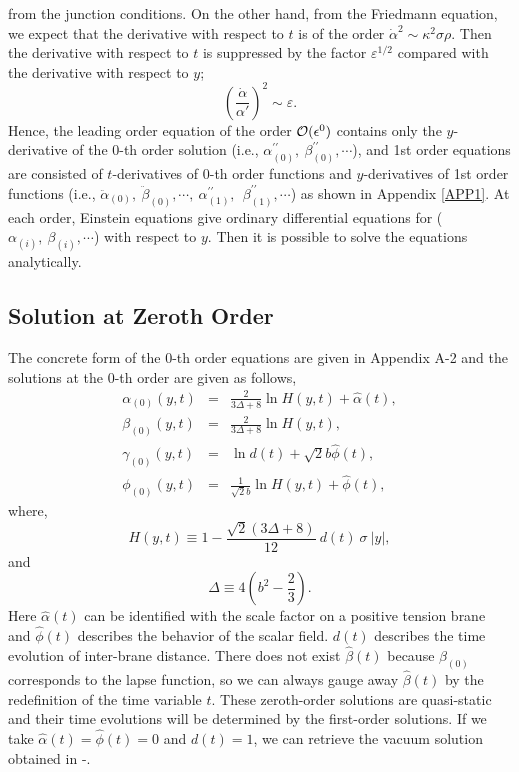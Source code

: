 \documentclass[a4paper,11pt]{article}
\begin{document}
from the junction conditions.
On the other hand, from the Friedmann equation, we expect 
that the derivative with respect to $t$ is of the order 
$\dot{\alpha}^2 \sim \kappa^2 \sigma \rho$. Then the derivative
with respect to $t$ is suppressed by the factor $\varepsilon^{1/2}$
compared with the derivative with respect to $y$;
\begin{equation}
\left( \frac{\dot{\alpha}}{\alpha'} \right)^2  \sim \varepsilon.
\end{equation}
Hence, the leading order equation of the order ${\cal O}(\epsilon^0)$ 
contains only the $y$-derivative of the 0-th order solution
(i.e., $\alpha_{(0)}^{\prime\prime},\ 
\beta_{(0)}^{\prime\prime}, \cdots$),  
and 1st order equations are consisted of $t$-derivatives of 0-th 
order functions and $y$-derivatives of 1st order functions 
(i.e., $\ddot{\alpha}_{(0)}, \ \ddot{\beta}_{(0)}, \cdots, \ 
 \alpha_{(1)}^{\prime\prime},\ \ \beta_{(1)}^{\prime\prime}, 
\cdots$) as shown in Appendix \ref{APP1}. 
At each order, Einstein equations give 
ordinary differential equations for ($\alpha_{(i)},\ \beta_{(i)},
\cdots$) with respect to $y$. Then it is possible to solve the 
equations analytically.

   
\subsection{Solution at Zeroth Order} 

The concrete form of the 0-th order equations are given in 
Appendix A-2 and the solutions at the 0-th order are given 
as follows, 
\begin{eqnarray}
\alpha_{(0)}(y,t) &=& \frac{2}{3\Delta +8}\ln H(y,t) + \hat{\alpha}(t), \\
\beta_{(0)}(y,t) &=& \frac{2}{3\Delta +8}\ln H(y,t),  \\
\gamma_{(0)}(y,t) &=& \ln d(t) + \sqrt{2}b\hat{\phi}(t), \\
\phi_{(0)}(y,t) &=& \frac{1}{\sqrt{2}b}\ln H(y,t) + \hat{\phi}(t), 
\end{eqnarray}
where, 
\begin{equation}
H(y,t) \equiv 1 - \frac{\sqrt{2}(3\Delta +8)}{12}\ d(t)\ \sigma \ |y|, 
\end{equation}
and 
\begin{equation}
\Delta \equiv 4\left(b^2-\frac{2}{3} \right). 
\end{equation}
Here $\hat{\alpha}(t)$ can be identified with the scale factor 
on a positive tension brane and $\hat{\phi}(t)$ describes the behavior of the 
scalar field. $d(t)$ describes the time evolution of inter-brane distance. 
There does not exist $\hat{\beta}(t)$ because $\beta_{(0)}$ corresponds 
to the lapse function, so we can always gauge away $\hat{\beta}(t)$ 
by the redefinition of the time variable $t$. 
These zeroth-order solutions are quasi-static and their time evolutions 
will be determined by the first-order solutions.  
If we take $\hat{\alpha}(t)=\hat{\phi}(t)=0$ and $d(t)=1$, we can 
retrieve the vacuum solution obtained in \cite{cvetic}-\cite{CLP}. 
\end{document}
